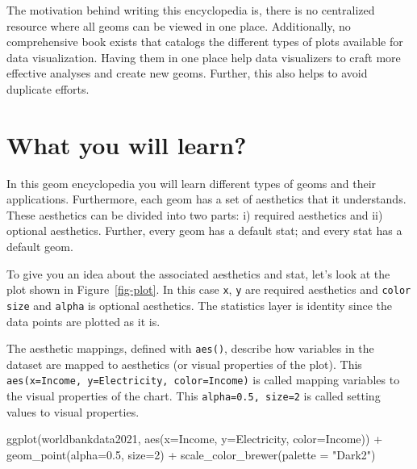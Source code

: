 \documentclass[
  letterpaper,
  DIV=11,
  numbers=noendperiod]{scrreprt}
\newenvironment{Shaded}{\begin{snugshade}}{\end{snugshade}}
\newcommand{\AttributeTok}[1]{\textcolor[rgb]{0.40,0.45,0.13}{#1}}
\newcommand{\DecValTok}[1]{\textcolor[rgb]{0.68,0.00,0.00}{#1}}
\newcommand{\FloatTok}[1]{\textcolor[rgb]{0.68,0.00,0.00}{#1}}
\newcommand{\FunctionTok}[1]{\textcolor[rgb]{0.28,0.35,0.67}{#1}}
\newcommand{\NormalTok}[1]{\textcolor[rgb]{0.00,0.23,0.31}{#1}}
\newcommand{\SpecialCharTok}[1]{\textcolor[rgb]{0.37,0.37,0.37}{#1}}
\newcommand{\StringTok}[1]{\textcolor[rgb]{0.13,0.47,0.30}{#1}}
\begin{document}

The motivation behind writing this encyclopedia is, there is no
centralized resource where all geoms can be viewed in one place.
Additionally, no comprehensive book exists that catalogs the different
types of plots available for data visualization. Having them in one
place help data visualizers to craft more effective analyses and create
new geoms. Further, this also helps to avoid duplicate efforts.

\section*{What you will learn?}\label{what-you-will-learn}


In this {geom encyclopedia} you will learn different types of geoms and
their applications. Furthermore, each geom has a set of aesthetics that
it understands. These aesthetics can be divided into two parts: i)
required aesthetics and ii) optional aesthetics. Further, every geom has
a default stat; and every stat has a default geom.

To give you an idea about the associated aesthetics and stat, let's look
at the plot shown in Figure~\ref{fig-plot}. In this case \texttt{x},
\texttt{y} are required aesthetics and \texttt{color} \texttt{size} and
\texttt{alpha} is optional aesthetics. The statistics layer is identity
since the data points are plotted as it is.

The aesthetic mappings, defined with \texttt{aes()}, describe how
variables in the dataset are mapped to aesthetics (or visual properties
of the plot). This \texttt{aes(x=Income,\ y=Electricity,\ color=Income)}
is called mapping variables to the visual properties of the chart. This
\texttt{alpha=0.5,\ size=2} is called setting values to visual
properties.

\begin{Shaded}
\begin{Highlighting}[]
\FunctionTok{ggplot}\NormalTok{(worldbankdata2021, }\FunctionTok{aes}\NormalTok{(}\AttributeTok{x=}\NormalTok{Income, }\AttributeTok{y=}\NormalTok{Electricity, }\AttributeTok{color=}\NormalTok{Income)) }\SpecialCharTok{+} 
  \FunctionTok{geom\_point}\NormalTok{(}\AttributeTok{alpha=}\FloatTok{0.5}\NormalTok{, }\AttributeTok{size=}\DecValTok{2}\NormalTok{) }\SpecialCharTok{+}
  \FunctionTok{scale\_color\_brewer}\NormalTok{(}\AttributeTok{palette =} \StringTok{"Dark2"}\NormalTok{)}
\end{Highlighting}
\end{Shaded}
\end{document}
